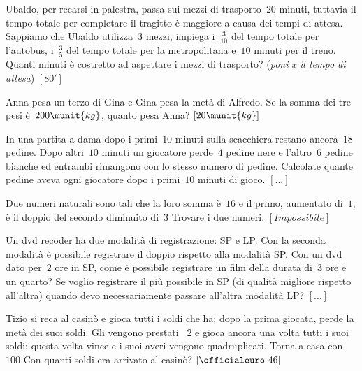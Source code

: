 \begin{htmulticols}{2}
\begin{esercizio}[*]
\label{ese:14.50}
Ubaldo, per recarsi in palestra, passa sui mezzi di trasporto~\(20\) minuti, 
tuttavia il tempo totale per completare il tragitto è maggiore a causa dei 
tempi 
di attesa. Sappiamo che Ubaldo utilizza~\(3\) mezzi, impiega i~\(\frac{3}{10}\) 
del 
tempo totale per l'autobus, i~\(\frac{3}{5}\) del tempo totale per la 
metropolitana e~\(10\) minuti per il treno. Quanti minuti è costretto ad 
aspettare 
i mezzi di trasporto? (\emph{poni x il tempo di attesa})
 \hfill \(\left[80'\right]\)
\end{esercizio}

\begin{esercizio}[*]
\label{ese:14.51}
Anna pesa un terzo di Gina e Gina pesa la metà di Alfredo. Se la somma dei tre 
pesi è~\(200\munit{kg}\), quanto pesa Anna? \hfill \(\left[20\munit{kg}\right]\)
\end{esercizio}

\begin{esercizio}
\label{ese:14.52}
In una partita a dama dopo i primi~\(10\) minuti sulla scacchiera restano 
ancora~\(18\) pedine. Dopo altri~\(10\) minuti un giocatore perde~\(4\) pedine 
nere e 
l'altro~\(6\) pedine bianche ed entrambi rimangono con lo stesso numero di 
pedine. 
Calcolate quante pedine aveva ogni giocatore dopo i primi~\(10\) minuti di 
gioco.
 \hfill \(\left[...\right]\)
\end{esercizio}

\begin{esercizio}[*]
\label{ese:14.53}
Due numeri naturali sono tali che la loro somma è~\(16\) e il primo, aumentato 
di~\(1\), è il doppio del secondo diminuito di~\(3\) Trovare i due numeri.
 \hfill \(\left[Impossibile\right]\)
\end{esercizio}

\begin{esercizio}
\label{ese:14.54}
Un dvd recoder ha due modalità di registrazione: SP e LP. Con la seconda 
modalità è possibile registrare il doppio rispetto alla modalità SP. Con un dvd 
dato per~\(2\) ore in SP, come è possibile registrare un film della durata 
di~\(3\) 
ore e un quarto? Se voglio registrare il più possibile in SP (di qualità 
migliore rispetto all'altra) quando devo necessariamente passare all'altra 
modalità LP? \hfill \(\left[...\right]\)
\end{esercizio}

\begin{esercizio}[*]
\label{ese:14.55}
Tizio si reca al casinò e gioca tutti i soldi che ha; dopo la prima giocata, 
perde la metà dei suoi soldi. Gli vengono prestati \officialeuro~\(2\) e gioca 
ancora una volta tutti i suoi soldi; questa volta vince e i suoi averi vengono 
quadruplicati. Torna a casa con \officialeuro~\(100\) Con quanti soldi era 
arrivato al casinò? \hfill \(\left[\officialeuro~46\right]\)
\end{esercizio}


\end{htmulticols}
